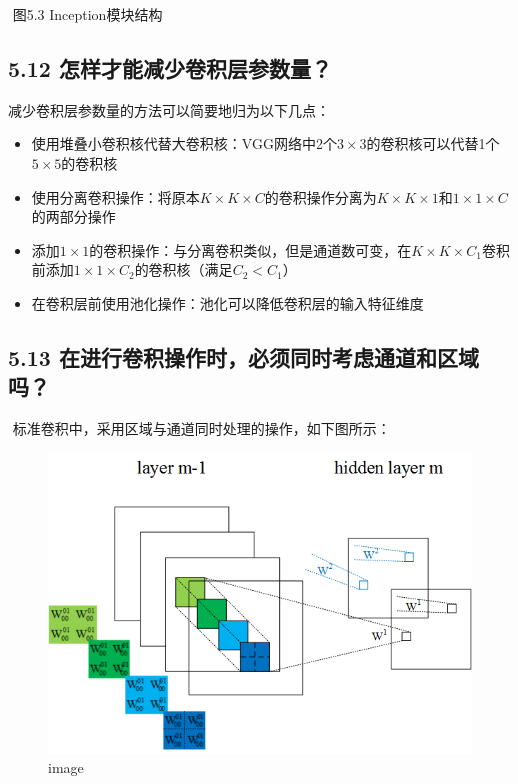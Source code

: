 ​ 图5.3 Inception模块结构

\subsection{5.12
怎样才能减少卷积层参数量？}\label{ux600eux6837ux624dux80fdux51cfux5c11ux5377ux79efux5c42ux53c2ux6570ux91cf}

减少卷积层参数量的方法可以简要地归为以下几点：

\begin{itemize}
\tightlist
\item
  使用堆叠小卷积核代替大卷积核：VGG网络中2个\(3\times 3\)的卷积核可以代替1个\(5\times 5\)的卷积核
\item
  使用分离卷积操作：将原本\(K\times K\times C\)的卷积操作分离为\(K\times K\times 1\)和\(1\times1\times C\)的两部分操作
\item
  添加\(1\times 1\)的卷积操作：与分离卷积类似，但是通道数可变，在\(K\times K\times C_1\)卷积前添加\(1\times1\times C_2\)的卷积核（满足\(C_2 <C_1\)）
\item
  在卷积层前使用池化操作：池化可以降低卷积层的输入特征维度
\end{itemize}

\subsection{5.13
在进行卷积操作时，必须同时考虑通道和区域吗？}\label{ux5728ux8fdbux884cux5377ux79efux64cdux4f5cux65f6ux5fc5ux987bux540cux65f6ux8003ux8651ux901aux9053ux548cux533aux57dfux5417}

​ 标准卷积中，采用区域与通道同时处理的操作，如下图所示：

\begin{figure}
\centering
\includegraphics{./img/ch5/5.13-1.png}
\caption{image}
\end{figure}

